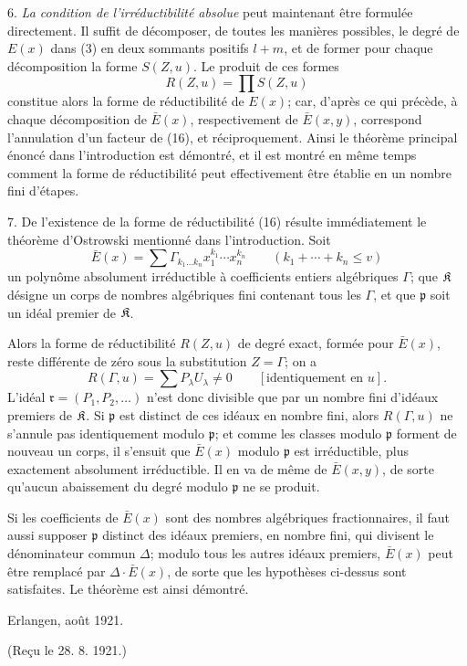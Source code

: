 \documentclass[11pt]{article}
\begin{document}
6. \emph{La condition de l'irréductibilité absolue} peut maintenant être formulée directement. Il suffit de décomposer, de toutes les manières possibles, le degré de $E(x)$ dans (3) en deux sommants positifs $l+m$, et de former pour chaque décomposition la forme $S(Z,u)$. Le produit de ces formes
\begin{equation}
 R(Z,u)=\prod S(Z,u)
\tag{16}
\end{equation}
constitue alors la forme de réductibilité de $E(x)$; car, d'après ce qui précède, à chaque décomposition de $\bar E(x)$, respectivement de $\bar E(x,y)$, correspond l'annulation d'un facteur de (16), et réciproquement. Ainsi le théorème principal énoncé dans l'introduction est démontré, et il est montré en même temps comment la forme de réductibilité peut effectivement être établie en un nombre fini d'étapes.

7. De l'existence de la forme de réductibilité (16) résulte immédiatement le théorème d'Ostrowski mentionné dans l'introduction. Soit
\[
 \bar E(x)=\sum \Gamma_{k_1\ldots k_n}x_1^{k_1}\cdots x_n^{k_n}
 \qquad(k_1+\cdots+k_n\le v)
\]
un polynôme absolument irréductible à coefficients entiers algébriques $\Gamma$; que $\mathfrak K$ désigne un corps de nombres algébriques fini contenant tous les $\Gamma$, et que $\mathfrak p$ soit un idéal premier de $\mathfrak K$.

Alors la forme de réductibilité $R(Z,u)$ de degré exact, formée pour $\bar E(x)$, reste différente de zéro sous la substitution $Z=\Gamma$; on a
\[
 R(\Gamma,u)=\sum P_\lambda U_\lambda\ne0\qquad[\text{identiquement en }u].
\]
L'idéal $\mathfrak r=(P_1,P_2,\ldots)$ n'est donc divisible que par un nombre fini d'idéaux premiers de $\mathfrak K$. Si $\mathfrak p$ est distinct de ces idéaux en nombre fini, alors $R(\Gamma,u)$ ne s'annule pas identiquement modulo $\mathfrak p$; et comme les classes modulo $\mathfrak p$ forment de nouveau un corps, il s'ensuit que $\bar E(x)$ modulo $\mathfrak p$ est irréductible, plus exactement absolument irréductible. Il en va de même de $\bar E(x,y)$, de sorte qu'aucun abaissement du degré modulo $\mathfrak p$ ne se produit.

Si les coefficients de $\bar E(x)$ sont des nombres algébriques fractionnaires, il faut aussi supposer $\mathfrak p$ distinct des idéaux premiers, en nombre fini, qui divisent le dénominateur commun $\Delta$; modulo tous les autres idéaux premiers, $\bar E(x)$ peut être remplacé par $\Delta\cdot\bar E(x)$, de sorte que les hypothèses ci-dessus sont satisfaites. Le théorème est ainsi démontré.

\begin{flushleft}
Erlangen, août 1921.
\end{flushleft}
\begin{center}
(Reçu le 28. 8. 1921.)
\end{center}

\clearpage

\ifdefined\NoetherPaperTwentyBodyOnly
\else
\end{document}
